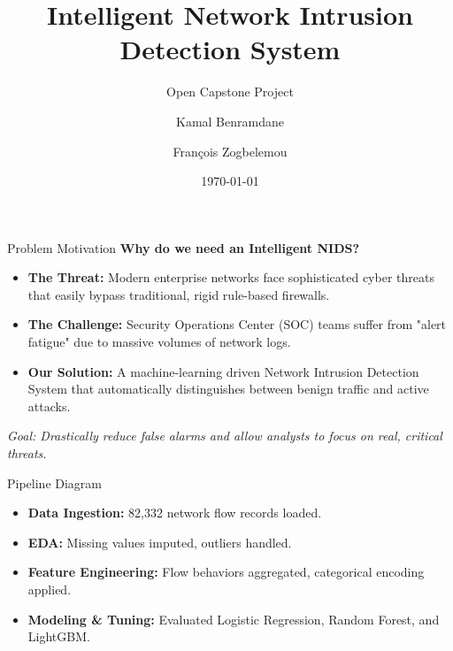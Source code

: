 \documentclass[10pt,aspectratio=169]{beamer}
\title[Intelligent NIDS]{Intelligent Network Intrusion Detection System}
\subtitle{Open Capstone Project}
\author[Kamal \& Fran\c{c}ois]{Kamal Benramdane \and Fran\c{c}ois Zogbelemou}
\institute[EHTP]{}
\date{\today}
\begin{document}
\begin{frame}
    \titlepage
\end{frame}

\begin{frame}{Problem Motivation}
    \textbf{Why do we need an Intelligent NIDS?}
    \vspace{0.5cm}
    \begin{itemize}
        \item \textbf{The Threat:} Modern enterprise networks face sophisticated cyber threats that easily bypass traditional, rigid rule-based firewalls.
        \item \textbf{The Challenge:} Security Operations Center (SOC) teams suffer from "alert fatigue" due to massive volumes of network logs.
        \item \textbf{Our Solution:} A machine-learning driven Network Intrusion Detection System that automatically distinguishes between benign traffic and active attacks.
    \end{itemize}
    \vspace{0.5cm}
    \textit{Goal: Drastically reduce false alarms and allow analysts to focus on real, critical threats.}
\end{frame}

\begin{frame}{Pipeline Diagram}
    \centering
    
    \vspace{1cm}
    \begin{itemize}
        \item \textbf{Data Ingestion:} 82,332 network flow records loaded.
        \item \textbf{EDA:} Missing values imputed, outliers handled.
        \item \textbf{Feature Engineering:} Flow behaviors aggregated, categorical encoding applied.
        \item \textbf{Modeling \& Tuning:} Evaluated Logistic Regression, Random Forest, and LightGBM.
    \end{itemize}
\end{frame}
\end{document}
